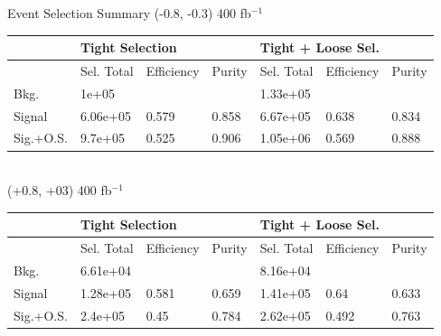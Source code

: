 \documentclass[10pt]{beamer}
\begin{document}
\begin{frame}{Event Selection Summary}
(-0.8, -0.3) 400 fb$^{-1}$\\
 \begin{tabular}{ |p{}|p{}p{}|p{}|p{}p{}p{}|} 
 \hline 
   &  \multicolumn{3}{|l|}{Tight Selection} &  \multicolumn{3}{|l|}{ Tight + Loose Sel.}  \\  \hline  
 & Sel. Total & Efficiency & Purity & Sel. Total & Efficiency & Purity \\ 
 \hline  
 Bkg. & 1e+05 & & & 1.33e+05 & &  \\ 
 Signal & 6.06e+05 & 0.579 & 0.858 & 6.67e+05 & 0.638 & 0.834 \\ 
 Sig.+O.S. & 9.7e+05 & 0.525 & 0.906 & 1.05e+06 & 0.569 & 0.888 \\ 
\hline 
\end{tabular} \\
(+0.8, +03) 400 fb$^{-1}$\\
 \begin{tabular}{ |p{}|p{}p{}|p{}|p{}p{}p{}|} 
 \hline 
   &  \multicolumn{3}{|l|}{Tight Selection} &  \multicolumn{3}{|l|}{ Tight + Loose Sel.}  \\  \hline  
 & Sel. Total & Efficiency & Purity & Sel. Total & Efficiency & Purity \\ 
 \hline  
 Bkg. & 6.61e+04 & & & 8.16e+04 & &  \\ 
 Signal & 1.28e+05 & 0.581 & 0.659 & 1.41e+05 & 0.64 & 0.633 \\ 
 Sig.+O.S. & 2.4e+05 & 0.45 & 0.784 & 2.62e+05 & 0.492 & 0.763 \\ 
\hline 
\end{tabular} 

\end{frame}
\end{document}

